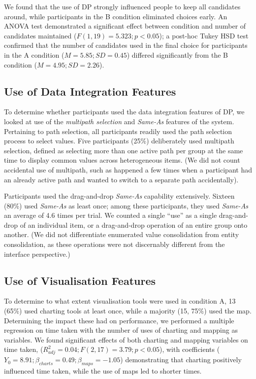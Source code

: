 \documentclass{sigchi}
\begin{document}
We found that the use of DP strongly influenced people to keep all candidates around, while participants in the B condition eliminated choices early.  An ANOVA test demonstrated a significant effect between condition and number of candidates maintained ($F(1,19)=5.323; p<0.05$); a post-hoc Tukey HSD test confirmed that  the number of candidates used in the final choice for participants in the A condition ($M=5.85;SD=0.45$) differed significantly from the B condition ($M=4.95; SD=2.26$).

\subsection{Use of Data Integration Features}

To determine whether participants used the data integration features of DP, we looked at use of the \emph{multipath selection} and \emph{Same-As} features of the system.   Pertaining to path selection, all participants readily used the path selection process to select values.   Five participants (25\%) deliberately used multipath selection, defined as selecting more than one active path per group at the same time to display common values across heterogeneous items. (We did not count accidental use of multipath, such as happened a few times when a participant had an already active path and wanted to switch to a separate path accidentally).

Participants used the drag-and-drop \emph{Same-As} capability extensively. Sixteen (80\%) used \emph{Same-As} as least once; among these participants, they used \emph{Same-As} an average of 4.6 times per trial. We counted a single ``use'' as a single drag-and-drop of an individual item, or a drag-and-drop operation of an entire group onto another.  (We did not differentiate enumerated value consolidation from entity consolidation, as these operations were not discernably different from the interface perspective.)


\subsection{Use of Visualisation Features}
To determine to what extent visualisation tools were used in condition A, 13 (65\%) used charting tools at least once, while a majority (15, 75\%) used the map.  Determining the impact these had on performance, we performed a multiple regression on time taken with the number of uses of charting and mapping as variables.   We found significant effects of both charting and mapping variables on time taken, ($R^2_{adj} = 0.04; F(2,17)=3.79; p<0.05$), with coefficients ($Y_0=8.91;\beta_{charts}=0.49;\beta_{maps}=-1.05$) demonstrating that charting positively influenced time taken, while the use of maps led to shorter times.
\end{document}
